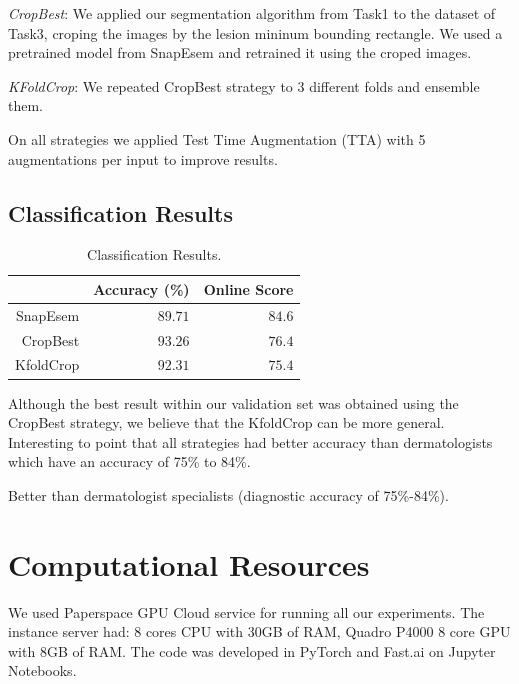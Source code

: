 \emph{CropBest}: We applied our segmentation algorithm from Task1 to the dataset of Task3, croping the images by the lesion mininum bounding rectangle. We used a pretrained model from SnapEsem and retrained it using the croped images.

\emph{KFoldCrop}: We repeated CropBest strategy to 3 different folds and ensemble them. 

On all strategies we applied Test Time Augmentation (TTA) with 5 augmentations per input to improve results.

\subsection{Classification Results}

\begin{table}[]
\centering
\caption{Classification Results.}
\label{tabela}
\begin{tabular}{@{}rrr@{}}
\toprule
            & \multicolumn{1}{c}{Accuracy (\%)} & \multicolumn{1}{c}{Online Score} \\ \midrule
SnapEsem & \(89.71\)& \(84.6\)                                  \\ \midrule
CropBest   & \(93.26\)&  \(76.4\)                                \\ \midrule
KfoldCrop    & \(92.31\)  & \(75.4\)                              \\ \bottomrule
\end{tabular}
\end{table}

Although the best result within our validation set was obtained using the CropBest strategy, we believe that the KfoldCrop can be more general. Interesting to point that all strategies had better accuracy than dermatologists which have an accuracy of 75\% to 84\%\cite{isic}. 

Better than dermatologist specialists (diagnostic accuracy of 75\%-84\%).

\section{Computational Resources\label{resources}}
We used Paperspace GPU Cloud service for running all our experiments. The instance server had: 8 cores CPU with 30GB of RAM, Quadro P4000 8 core GPU with 8GB of RAM. 
The code was developed in PyTorch and Fast.ai\cite{fastai} on Jupyter Notebooks.
